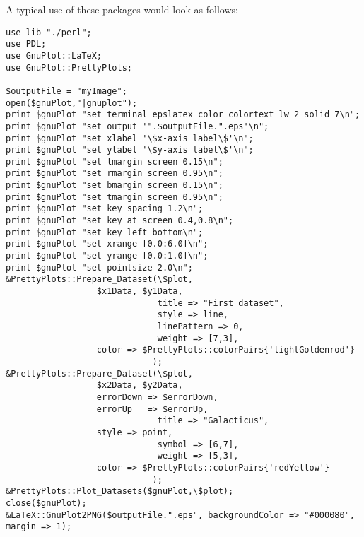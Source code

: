 A typical use of these packages would look as follows:
\begin{verbatim}
use lib "./perl";
use PDL;
use GnuPlot::LaTeX;
use GnuPlot::PrettyPlots;

$outputFile = "myImage";
open($gnuPlot,"|gnuplot");
print $gnuPlot "set terminal epslatex color colortext lw 2 solid 7\n";
print $gnuPlot "set output '".$outputFile.".eps'\n";
print $gnuPlot "set xlabel '\$x-axis label\$'\n";
print $gnuPlot "set ylabel '\$y-axis label\$'\n";
print $gnuPlot "set lmargin screen 0.15\n";
print $gnuPlot "set rmargin screen 0.95\n";
print $gnuPlot "set bmargin screen 0.15\n";
print $gnuPlot "set tmargin screen 0.95\n";
print $gnuPlot "set key spacing 1.2\n";
print $gnuPlot "set key at screen 0.4,0.8\n";
print $gnuPlot "set key left bottom\n";
print $gnuPlot "set xrange [0.0:6.0]\n";
print $gnuPlot "set yrange [0.0:1.0]\n";
print $gnuPlot "set pointsize 2.0\n";
&PrettyPlots::Prepare_Dataset(\$plot,
			      $x1Data, $y1Data,
                              title => "First dataset",
                              style => line,
                              linePattern => 0,
                              weight => [7,3],
			      color => $PrettyPlots::colorPairs{'lightGoldenrod'}
                             );
&PrettyPlots::Prepare_Dataset(\$plot,
			      $x2Data, $y2Data,
			      errorDown => $errorDown,
			      errorUp   => $errorUp,
                              title => "Galacticus",
			      style => point,
                              symbol => [6,7],
                              weight => [5,3],
			      color => $PrettyPlots::colorPairs{'redYellow'}
                             );
&PrettyPlots::Plot_Datasets($gnuPlot,\$plot);
close($gnuPlot);
&LaTeX::GnuPlot2PNG($outputFile.".eps", backgroundColor => "#000080", margin => 1);
\end{verbatim}

